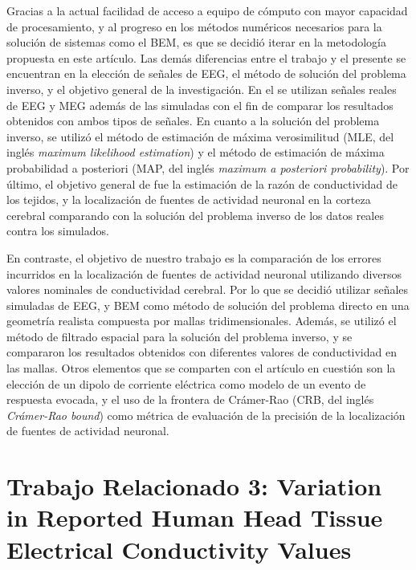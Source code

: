 Gracias a la actual facilidad de acceso a equipo de cómputo con mayor capacidad de procesamiento, y al progreso en los métodos numéricos necesarios para la solución de sistemas como el BEM, es que se decidió iterar en la metodología propuesta en este artículo. 
Las demás diferencias entre el trabajo \cite{Gutierrez2004} y el presente se encuentran en la elección de señales de EEG, el método de solución del problema inverso, y el objetivo general de la investigación.
En el \cite{Gutierrez2004} se utilizan señales reales de EEG y MEG además de las simuladas con el fin de comparar los resultados obtenidos con ambos tipos de señales.
En cuanto a la solución del problema inverso, se utilizó el método de estimación de máxima verosimilitud (MLE, del inglés \emph{maximum likelihood estimation}) y el método de estimación de máxima probabilidad a posteriori (MAP, del inglés \emph{maximum a posteriori probability}).
Por último, el objetivo general de \cite{Gutierrez2004} fue la estimación de la razón de conductividad de los tejidos, y la localización de fuentes de actividad neuronal en la corteza cerebral comparando con la solución del problema inverso de los datos reales contra los simulados.

En contraste, el objetivo de nuestro trabajo es la comparación de los errores incurridos en la localización de fuentes de actividad neuronal utilizando diversos valores nominales de conductividad cerebral. 
Por lo que se decidió utilizar señales simuladas de EEG, y BEM como método de solución del problema directo en una geometría realista compuesta por mallas tridimensionales.
Además, se utilizó el método de filtrado espacial para la solución del problema inverso, y se compararon los resultados obtenidos con diferentes valores de conductividad en las mallas.
Otros elementos que se comparten con el artículo en cuestión son la elección de un dipolo de corriente eléctrica como modelo de un evento de respuesta evocada, y el uso de la frontera de Crámer-Rao (CRB, del inglés \emph{Crámer-Rao bound}) como métrica de evaluación de la precisión de la localización de fuentes de actividad neuronal.

\section{Trabajo Relacionado 3: Variation in Reported Human Head Tissue Electrical Conductivity Values}
\label{sec:related:mccann}

